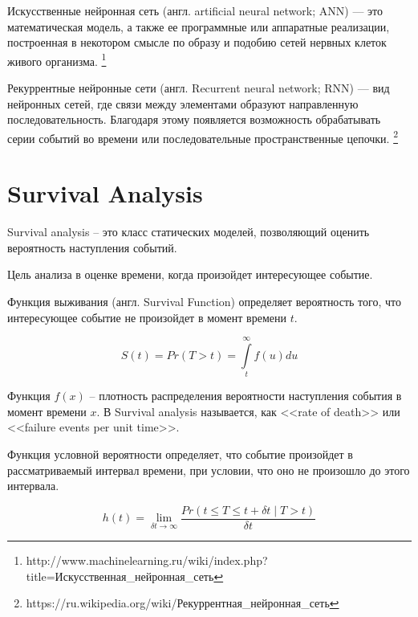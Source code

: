 \documentclass[times,specification,annotation]{itmo-student-thesis}
\begin{document}
\begin{definition}
    Искусственные нейронная сеть (англ. artificial neural network; ANN) — это математическая модель, а также ее программные или аппаратные реализации,
    построенная в некотором смысле по образу и подобию сетей нервных клеток живого организма.
    \footnote{http://www.machinelearning.ru/wiki/index.php?title=Искусственная_нейронная_сеть}
\end{definition}

\begin{definition}
    Рекуррентные нейронные сети (англ. Recurrent neural network; RNN) — вид нейронных сетей, 
    где связи между элементами образуют направленную последовательность. 
    Благодаря этому появляется возможность обрабатывать серии событий во времени или последовательные пространственные цепочки.
    \footnote{https://ru.wikipedia.org/wiki/Рекуррентная_нейронная_сеть}
\end{definition}

\section{Survival Analysis}

\begin{definition}
    Survival analysis – это класс статических моделей, позволяющий оценить вероятность наступления событий.
\end{definition}

Цель анализа в оценке времени, когда произойдет интересующее событие.

\begin{definition}
    Функция выживания (англ. Survival Function) определяет вероятность того, что интересующее событие не произойдет в момент времени \(t\).
\end{definition}

\begin{equation}\label{eq:sa}
    S(t) = Pr(T > t) = \int\limits_{t}^{\infty} f(u) du
\end{equation}

Функция $f(x)$ – плотность распределения вероятности наступления события в момент времени $x$.
В Survival analysis называется, как <<rate of death>> или <<failure events per unit time>>.

Функция условной вероятности определяет, что событие произойдет в рассматриваемый интервал времени, 
при условии, что оно не произошло до этого интервала.

\begin{equation}
    h(t) = \lim_{\delta t\to\infty} \frac{Pr(t \leq T \leq t + \delta t \mid T > t)}{\delta t}
\end{equation}
\end{document}
